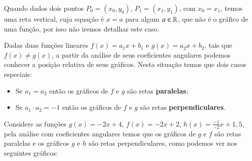 \begin{itemize}
\begin{exem}
  \end{exem}

  Quando dados dois pontos $P_0=(x_0, y_0)$, $P_1=(x_1, y_1)$, com $x_0 = x_1$, temos uma reta vertical, cuja equação é $x= a$ para algum $a \in \mathbb{R}$, que não é o gráfico de uma função, por isso não iremos detalhar este caso.

  Dadas duas funções lineares $f(x)=a_1 x + b_1$ e $g(x)= a_2 x + b_2$, tais que $f(x) \neq g(x)$, a partir da análise de seus coeficientes angulares podemos conhecer a posição relativa de seus gráficos. Nesta situação temos que dois casos especiais:
  \begin{itemize}
  \item Se $a_1= a_2$ então os gráficos de $f$ e $g$ são retas \textbf{paralelas};
  \item Se $a_1 \cdot a_2= -1$ então os gráficos de $f$ e $g$ são retas \textbf{perpendiculares}.
  \end{itemize}

  \begin{exem}
  Considere as funções $g(x)= -2x+4$, $f(x)= -2x+2$, $h(x)= \frac{-1}{-2}x+ 1,5$, pela análise com coeficientes angulares temos que os gráficos de $g$ e $f$ são retas paralelas e os gráficos $g$ e $h$ são retas perpendiculares, como podemos ver nos seguintes gráficos:
     \begin{figure}[H]
  \end{figure}
  \end{exem}




\end{itemize}
